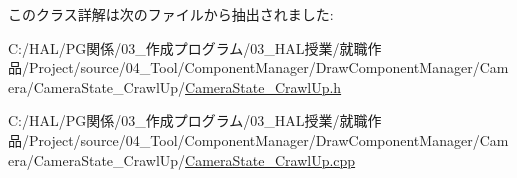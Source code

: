 このクラス詳解は次のファイルから抽出されました\+:\begin{DoxyCompactItemize}
\item 
C\+:/\+H\+A\+L/\+P\+G関係/03\+\_\+作成プログラム/03\+\_\+\+H\+A\+L授業/就職作品/\+Project/source/04\+\_\+\+Tool/\+Component\+Manager/\+Draw\+Component\+Manager/\+Camera/\+Camera\+State\+\_\+\+Crawl\+Up/\mbox{\hyperlink{_camera_state___crawl_up_8h}{Camera\+State\+\_\+\+Crawl\+Up.\+h}}\item 
C\+:/\+H\+A\+L/\+P\+G関係/03\+\_\+作成プログラム/03\+\_\+\+H\+A\+L授業/就職作品/\+Project/source/04\+\_\+\+Tool/\+Component\+Manager/\+Draw\+Component\+Manager/\+Camera/\+Camera\+State\+\_\+\+Crawl\+Up/\mbox{\hyperlink{_camera_state___crawl_up_8cpp}{Camera\+State\+\_\+\+Crawl\+Up.\+cpp}}\end{DoxyCompactItemize}
